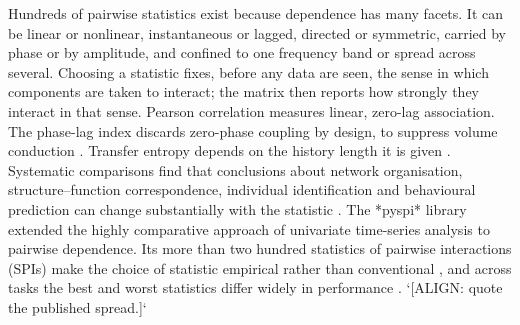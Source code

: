\documentclass[pdflatex,sn-nature,iicol]{sn-jnl}
\begin{document}
Hundreds of pairwise statistics exist because dependence has many facets. It can be linear or nonlinear, instantaneous or lagged, directed or symmetric, carried by phase or by amplitude, and confined to one frequency band or spread across several. Choosing a statistic fixes, before any data are seen, the sense in which components are taken to interact; the matrix then reports how strongly they interact in that sense. Pearson correlation measures linear, zero-lag association. The phase-lag index discards zero-phase coupling by design, to suppress volume conduction \cite{nolte2004identifying,stam2007phase}. Transfer entropy depends on the history length it is given \cite{schreiber2000measuring,wibral2013measuring}. Systematic comparisons find that conclusions about network organisation, structure–function correspondence, individual identification and behavioural prediction can change substantially with the statistic \cite{smith2011network,wang2014systematic,liu2025benchmarking}. The *pyspi* library extended the highly comparative approach of univariate time-series analysis \cite{fulcher2013highly,fulcher2017hctsa} to pairwise dependence. Its more than two hundred statistics of pairwise interactions (SPIs) make the choice of statistic empirical rather than conventional \cite{cliff2023unifying}, and across tasks the best and worst statistics differ widely in performance \cite{cliff2023unifying,bryant2024extracting}. `[ALIGN: quote the published spread.]`
\end{document}
